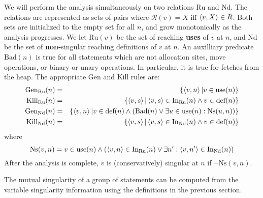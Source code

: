 \documentclass[11pt,notitlepage]{article}
\begin{document}
We will perform the analysis simultaneously on two relations
$\text{Ru}$ and $\text{Nd}$.
The relations are represented as
sets of pairs  where
$\mathcal{R}(v)=X$ iff $\left\langle v,X \right\rangle \in R$.
Both sets are initialized
to the empty set for all $n$, and grow monotonically as the analysis
progresses.
We let
$\text{Ru}(v)$ be the set of reaching \textbf{uses} of $v$ at $n$,
 and
$\text{Nd}$ be the set of \textbf{non-}singular reaching definitions
of $v$ at $n$.
An auxilliary predicate $\text{Bad}(n)$ is true for all statements
which are not allocation sites, move operations, or binary or unary
operations.  In particular, it is true for fetches from the heap.
The appropriate Gen and Kill rules are:
\begin{eqnarray*}
\text{Gen}_\text{Ru}(n) &=&
	\{ \tuple{v, n} | v \in \text{use}(n) \} \\
\text{Kill}_\text{Ru}(n) &=&
	\{ \tuple{v, s} | \tuple{v,s} \in \text{In}_\text{Ru}(n) \wedge
                          v \in \text{def}(n) \} \\
%
\text{Gen}_\text{Nd}(n) &=&
	\left\{ \tuple{v, n} | v \in \text{def}(n) \wedge
\left( \text{Bad}(n) \vee
\exists u\in\text{use}(n):\text{Ns}(u,n)
 \right) \right\}
\\
\text{Kill}_\text{Nd}(n) &=&
	\{ \tuple{v, s} | \tuple{v,s} \in \text{In}_\text{Nd}(n) \wedge
                          v \in \text{def}(n) \} %
\end{eqnarray*}
where
\begin{displaymath}
\text{Ns}(v,n) =
v\in\text{use}(n) \wedge \left(
\left\langle v,n \right\rangle \in \text{In}_\text{Ru}(n) \vee
\exists n': \left\langle v,n' \right\rangle\in\text{In}_\text{Nd}(n)
\right)
\end{displaymath}
After the analysis is complete, $v$ is (conservatively) singular at
$n$ if $\neg\text{Ns}(v,n)$.


The mutual singularity of a group of statements can be computed from
the variable singularity information using the definitions in the
previous section.
\end{document}
